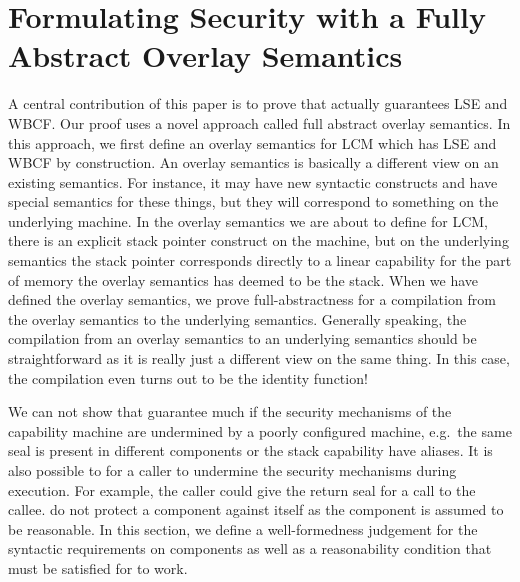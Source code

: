 \documentclass[acmsmall,review,anonymous]{acmart}\settopmatter{printfolios=true,printccs=false,printacmref=false}
\newcommand{\trgcm}{\textsc{LCM}}
\begin{document}
\section{Formulating Security with a Fully Abstract Overlay Semantics}
\label{sec:form-secur-with}
A central contribution of this paper is to prove that \stktokens{} actually guarantees LSE and WBCF.
Our proof uses a novel approach called full abstract overlay semantics.
In this approach, we first define an overlay semantics for \trgcm{} which has LSE and WBCF by construction.
An overlay semantics is basically a different view on an existing semantics.
For instance, it may have new syntactic constructs and have special semantics for these things, but they will correspond to something on the underlying machine.
In the overlay semantics we are about to define for \trgcm{}, there is an explicit stack pointer construct on the machine, but on the underlying semantics the stack pointer corresponds directly to a linear capability for the part of memory the overlay semantics has deemed to be the stack.
When we have defined the overlay semantics, we prove full-abstractness for a compilation from the overlay semantics to the underlying semantics. 
Generally speaking, the compilation from an overlay semantics to an underlying semantics should be straightforward as it is really just a different view on the same thing. 
In this case, the compilation even turns out to be the identity function!

We can not show that \stktokens{} guarantee much if the security mechanisms of the capability machine are undermined by a poorly configured machine, e.g.\ the same seal is present in different components or the stack capability have aliases.
It is also possible to for a caller to undermine the security mechanisms during execution.
For example, the caller could give the return seal for a call to the callee.
\stktokens{} do not protect a component against itself as the component is assumed to be reasonable. 
In this section, we define a well-formedness judgement for the syntactic requirements on components as well as a reasonability condition that must be satisfied for \stktokens{} to work.
\end{document}
